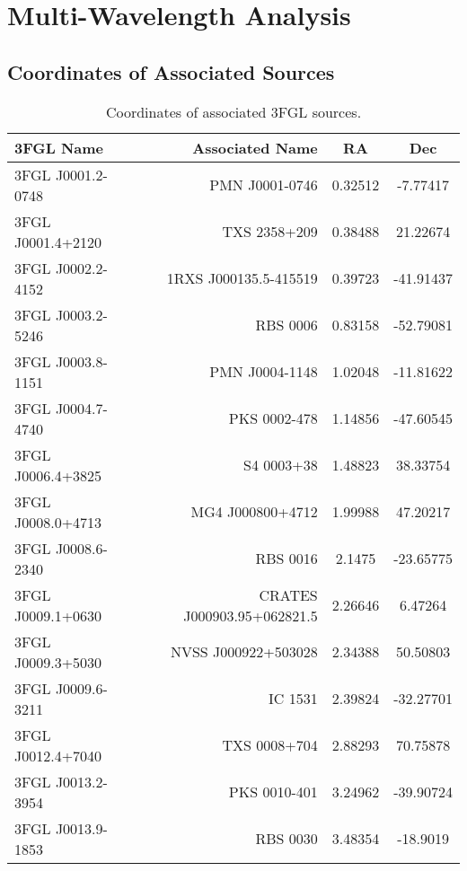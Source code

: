 \chapter{Multi-Wavelength Analysis}


\section{Coordinates of Associated Sources}

\begin{table}
\centering

\caption{Coordinates of associated 3FGL sources.}
\label{tab:assoc_coord}

\tiny

\begin{tabular}{l r c c}
\toprule
3FGL Name & Associated Name & RA & Dec \\
\midrule
3FGL J0001.2-0748  &  PMN J0001-0746  &  0.32512  &  -7.77417  \\
3FGL J0001.4+2120  &  TXS 2358+209  &  0.38488  &  21.22674  \\
3FGL J0002.2-4152  &  1RXS J000135.5-415519  &  0.39723  &  -41.91437  \\
3FGL J0003.2-5246  &  RBS 0006  &  0.83158  &  -52.79081  \\
3FGL J0003.8-1151  &  PMN J0004-1148  &  1.02048  &  -11.81622  \\
3FGL J0004.7-4740  &  PKS 0002-478  &  1.14856  &  -47.60545  \\
3FGL J0006.4+3825  &  S4 0003+38  &  1.48823  &  38.33754  \\
3FGL J0008.0+4713  &  MG4 J000800+4712  &  1.99988  &  47.20217  \\
3FGL J0008.6-2340  &  RBS 0016  &  2.1475  &  -23.65775  \\
3FGL J0009.1+0630  &  CRATES J000903.95+062821.5  &  2.26646  &  6.47264  \\
3FGL J0009.3+5030  &  NVSS J000922+503028  &  2.34388  &  50.50803  \\
3FGL J0009.6-3211  &  IC 1531  &  2.39824  &  -32.27701  \\
3FGL J0012.4+7040  &  TXS 0008+704  &  2.88293  &  70.75878  \\
3FGL J0013.2-3954  &  PKS 0010-401  &  3.24962  &  -39.90724  \\
3FGL J0013.9-1853  &  RBS 0030  &  3.48354  &  -18.9019  \\

\end{tabular}
\end{table}
